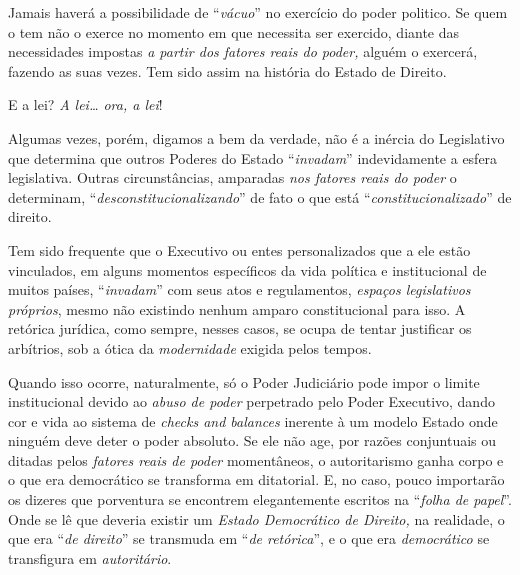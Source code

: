 Jamais haverá a possibilidade de ``\emph{vácuo}'' no exercício do poder
politico. Se quem o tem não o exerce no momento em que necessita ser
exercido, diante das necessidades impostas \emph{a partir dos fatores
reais do poder,} alguém o exercerá, fazendo as suas vezes. Tem sido
assim na história do Estado de Direito.

E a lei? \emph{A lei\ldots{} ora, a lei}!

Algumas vezes, porém, digamos a bem da verdade, não é a inércia do
Legislativo que determina que outros Poderes do Estado
``\emph{invadam}'' indevidamente a esfera legislativa. Outras
circunstâncias, amparadas \emph{nos fatores reais do poder} o
determinam, ``\emph{desconstitucionalizando}'' de fato o que está
``\emph{constitucionalizado}'' de direito.

Tem sido frequente que o Executivo ou entes personalizados que a ele
estão vinculados, em alguns momentos específicos da vida política e
institucional de muitos países, ``\emph{invadam}'' com seus atos e
regulamentos, \emph{espaços legislativos próprios}, mesmo não existindo
nenhum amparo constitucional para isso. A retórica jurídica, como
sempre, nesses casos, se ocupa de tentar justificar os arbítrios, sob a
ótica da \emph{modernidade} exigida pelos tempos.

Quando isso ocorre, naturalmente, só o Poder Judiciário pode impor o
limite institucional devido ao \emph{abuso de poder} perpetrado pelo
Poder Executivo, dando cor e vida ao sistema de \emph{checks and
balances} inerente à um modelo Estado onde ninguém deve deter o poder
absoluto. Se ele não age, por razões conjuntuais ou ditadas pelos
\emph{fatores reais de poder} momentâneos, o autoritarismo ganha corpo e
o que era democrático se transforma em ditatorial. E, no caso, pouco
importarão os dizeres que porventura se encontrem elegantemente escritos
na ``\emph{folha de papel}''. Onde se lê que deveria existir um
\emph{Estado Democrático de Direito,} na realidade, o que era ``\emph{de
direito}'' se transmuda em ``\emph{de retórica}'', e o que era
\emph{democrático} se transfigura em \emph{autoritário}.

